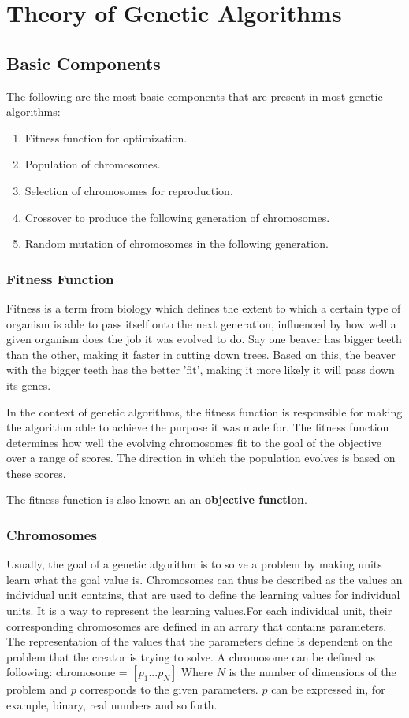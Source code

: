 \documentclass{article}
\begin{document}
\section{Theory of Genetic Algorithms}

\subsection{Basic Components}
The following are the most basic components that are present in most genetic algorithms:
\begin{enumerate}
    \item Fitness function for optimization.
    \item Population of chromosomes.
    \item Selection of chromosomes for reproduction.
    \item Crossover to produce the following generation of chromosomes.
    \item Random mutation of chromosomes in the following generation.
\end{enumerate}

\bigbreak
\subsubsection{Fitness Function}
Fitness is a term from biology which defines the extent to which a certain type of organism is able to pass itself onto the next generation, influenced by how well a given organism does the job it was evolved to do. Say one beaver has bigger teeth than the other, making it faster in cutting down trees. Based on this, the beaver with the bigger teeth has the better 'fit', making it more likely it will pass down its genes.

In the context of genetic algorithms, the fitness function is responsible for making the algorithm able to achieve the purpose it was made for. The fitness function determines how well the evolving chromosomes fit to the goal of the objective over a range of scores. The direction in which the population evolves is based on these scores.

The fitness function is also known an an \textbf{objective function}.

\bigbreak
\subsubsection{Chromosomes}
Usually, the goal of a genetic algorithm is to solve a problem by making units learn what the goal value is. Chromosomes can thus be described as the values an individual unit contains, that are used to define the learning values for individual units. It is a way to represent the learning values.\smallbreak For each individual unit, their corresponding chromosomes are defined in an arrary that contains parameters. The representation of the values that the parameters define is dependent on the problem that the creator is trying to solve. A chromosome can be defined as following:\bigbreak
chromosome = $\left[ p_{1} ... p_{N} \right]$\bigbreak
Where $N$ is the number of dimensions of the problem and $p$ corresponds to the given parameters. $p$ can be expressed in, for example, binary, real numbers and so forth.
\end{document}
